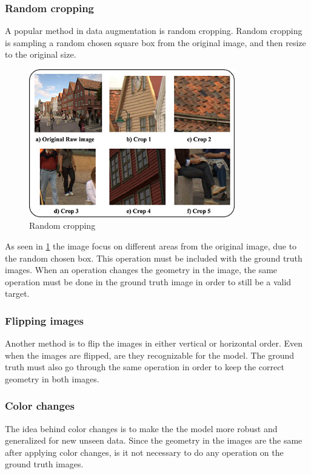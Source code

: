 \documentclass[USenglish]{ifimaster}  %
\begin{document}
\subsubsection{Random cropping}
A popular method in data augmentation is random cropping. Random cropping is sampling a random chosen square box from the original image, and then resize to the original size.
\begin{figure}[ht]
    \centering
    \includegraphics[width=0.8\textwidth]{bilder/random_cropping.png}
    \caption{Random cropping \cite{website:random_cropping}}
    \label{fig:random_cropping}
\end{figure}
As seen in \cref{fig:random_cropping} the image focus on different areas from the original image, due to the random chosen box. This operation must be included with the ground truth images. When an operation changes the geometry in the image, the same operation must be done in the ground truth image in order to still be a valid target. 
\subsubsection{Flipping images}
Another method is to flip the images in either vertical or horizontal order. Even when the images are flipped, are they recognizable for the model. The ground truth must also go through the same operation in order to keep the correct geometry in both images. 
\subsubsection{Color changes}
The idea behind color changes is to make the the model more robust and generalized for new unseen data. Since the geometry in the images are the same after applying color changes, is it not necessary to do any operation on the ground truth images.
\end{document}
